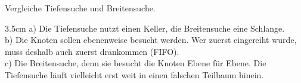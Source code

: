 \question[3]
Vergleiche Tiefensuche und Breitensuche.
\begin{solutionbox}{3.5cm}
a) Die Tiefensuche nutzt einen Keller, die Breitensuche eine Schlange. \\
b) Die Knoten sollen ebenenweise besucht werden. Wer zuerst eingereiht wurde, muss deshalb auch zuerst drankommen (FIFO). \\
c) Die Breitensuche, denn sie besucht die Knoten Ebene für Ebene. Die Tiefensuche läuft vielleicht erst weit in einen falschen Teilbaum hinein.
\end{solutionbox}
